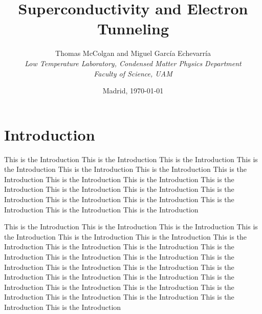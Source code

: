 \documentclass[twocolumn, twoside,a4paper,10pt]{article}
\title{\textbf{Superconductivity and Electron Tunneling}}
\author{Thomas McColgan and Miguel Garc\'ia Echevarr\'ia\\
	\small{\textit{Low Temperature Laboratory, Condensed Matter Physics Department}} \\
	\small{\textit{Faculty of Science, UAM}}
	}
\date{Madrid, \today}
\begin{document}

\section{Introduction}
This is the Introduction This is the Introduction This is the Introduction This is the Introduction This is the Introduction This is the Introduction This is the Introduction This is the Introduction This is the Introduction This is the Introduction This is the Introduction This is the Introduction This is the Introduction This is the Introduction This is the Introduction This is the Introduction This is the Introduction This is the Introduction 

This is the Introduction This is the Introduction This is the Introduction This is the Introduction This is the Introduction This is the Introduction This is the Introduction This is the Introduction This is the Introduction This is the Introduction This is the Introduction This is the Introduction This is the Introduction This is the Introduction This is the Introduction This is the Introduction This is the Introduction This is the Introduction This is the Introduction This is the Introduction This is the Introduction This is the Introduction This is the Introduction This is the Introduction This is the Introduction This is the Introduction

\end{document}
